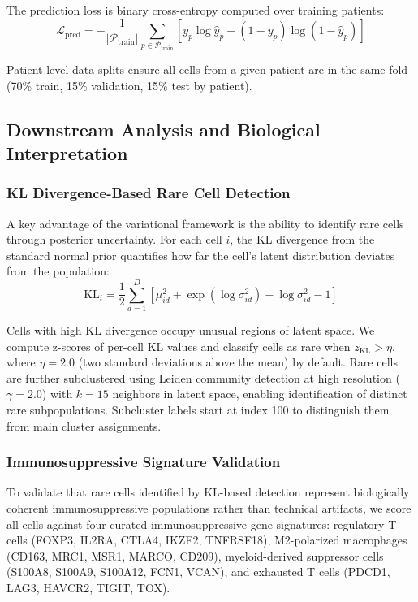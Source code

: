 \documentclass{article}
\begin{document}
The prediction loss is binary cross-entropy computed over training patients:
\begin{equation}
\mathcal{L}_{\text{pred}} = -\frac{1}{|\mathcal{P}_{\text{train}}|} \sum_{p \in \mathcal{P}_{\text{train}}} \left[ y_p \log \hat{y}_p + (1 - y_p) \log(1 - \hat{y}_p) \right]
\end{equation}

Patient-level data splits ensure all cells from a given patient are in the same fold (70\% train, 15\% validation, 15\% test by patient).

\subsection{Downstream Analysis and Biological Interpretation}

\subsubsection{KL Divergence-Based Rare Cell Detection}

A key advantage of the variational framework is the ability to identify rare cells through posterior uncertainty. For each cell $i$, the KL divergence from the standard normal prior quantifies how far the cell's latent distribution deviates from the population:
\begin{equation}
\text{KL}_i = \frac{1}{2} \sum_{d=1}^D \left[\mu_{id}^2 + \exp(\log\sigma_{id}^2) - \log\sigma_{id}^2 - 1\right]
\end{equation}

Cells with high KL divergence occupy unusual regions of latent space. We compute z-scores of per-cell KL values and classify cells as rare when $z_{\text{KL}} > \eta$, where $\eta = 2.0$ (two standard deviations above the mean) by default. Rare cells are further subclustered using Leiden community detection at high resolution ($\gamma = 2.0$) with $k = 15$ neighbors in latent space, enabling identification of distinct rare subpopulations. Subcluster labels start at index 100 to distinguish them from main cluster assignments.

\subsubsection{Immunosuppressive Signature Validation}
\label{sec:signature_validation}

To validate that rare cells identified by KL-based detection represent biologically coherent immunosuppressive populations rather than technical artifacts, we score all cells against four curated immunosuppressive gene signatures: regulatory T cells (FOXP3, IL2RA, CTLA4, IKZF2, TNFRSF18), M2-polarized macrophages (CD163, MRC1, MSR1, MARCO, CD209), myeloid-derived suppressor cells (S100A8, S100A9, S100A12, FCN1, VCAN), and exhausted T cells (PDCD1, LAG3, HAVCR2, TIGIT, TOX).
\end{document}
